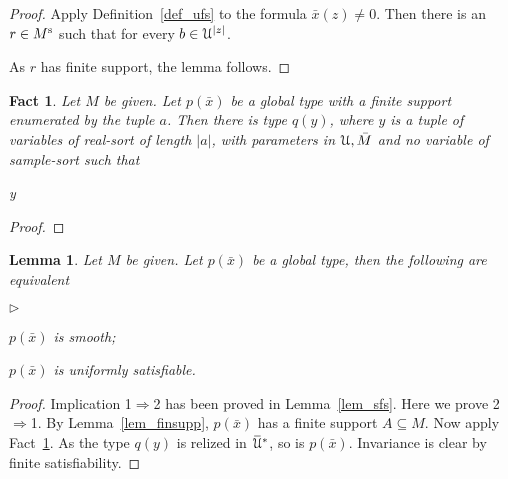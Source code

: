 \documentclass[10pt,openany]{article}
\newcommand{\mylabel}[1]{{\ssf{#1}}\hfill}
\renewenvironment{itemize}
  {\begin{list}{$\triangleright$}{%
   \setlength{\parskip}{0mm}
   \setlength{\topsep}{.4\baselineskip}
   \setlength{\rightmargin}{0mm}
   \setlength{\listparindent}{0mm}
   \setlength{\itemindent}{0mm}
   \setlength{\labelwidth}{3ex}
   \setlength{\itemsep}{.4\baselineskip}
   \setlength{\parsep}{0mm}
   \setlength{\partopsep}{0mm}
   \setlength{\labelsep}{1ex}
   \setlength{\leftmargin}{\labelwidth+\labelsep}
   \let\makelabel\mylabel}}{%
   \end{list}\vspace*{-\parskip}
  }
\def\E{\exists}
\def\proves{\vdash}
\def\proves{\vdash}
\newcommand{\barU}{\mkern 2mu\overline{\mkern-2mu\U\mkern-2mu}\mkern 2mu}
\def\IMP{\Rightarrow}
\def\imp{\rightarrow}
\def\iff{\leftrightarrow}
\def\U{\EuScript U}
\def\ssf#1{\textsf{\small #1}}
\newcounter{thm}[section]
\theoremstyle{mio}
\newtheorem{lemma}[thm]{Lemma}
\newtheorem{fact}[thm]{Fact}
\theoremstyle{liscio}
\begin{document}
\begin{proof}
  Apply Definition~\ref{def_ufs} to the formula $\bar x(z)\neq0$.
  Then there is an $r\in M^{\rm s}$ such that for every $b\in\U^{|z|}$.

  \ceq{\hfill p(\bar x)}{\proves}{\bar x(b)\neq0\imp r(b)\neq0.}

  As $r$ has finite support, the lemma follows.
\end{proof}

\begin{fact}\label{fact_finite_support}
  Let $M$ be given.
  Let $p(\bar x)$ be a global type with a finite support enumerated by the tuple $a$.
  Then  there is type $q(y)$, where $y$ is a tuple of variables of real-sort of length $|a|$, with parameters in $\U,\bar M$ and no variable of sample-sort such that

  {\iff}
  {\E y\ \Big[ q(y)\ \cup\ \{\bar x(a)=y\}\Big]}
\end{fact}

\begin{proof}
  
\end{proof}


\begin{lemma}
  Let $M$ be given.
  Let $p(\bar x)$ be a global type, then the following are equivalent
  \begin{itemize}
    \item[1.] $p(\bar x)$ is smooth;
    \item[2.] $p(\bar x)$ is uniformly satisfiable.
  \end{itemize}
\end{lemma}

\begin{proof}
  Implication \ssf{1}$\IMP$\ssf{2} has been proved in Lemma~\ref{lem_sfs}. 
  Here we prove \ssf{2}$\IMP$\ssf{1}. 
  By Lemma~\ref{lem_finsupp},  $p(\bar x)$ has a finite support $A\subseteq M$.   
  Now apply Fact~\ref{fact_finite_support}.
  As the type $q(y)$ is relized in $\barU^*$, so is  $p(\bar x)$.
  Invariance is clear by finite satisfiability.
\end{proof}

\end{document}
